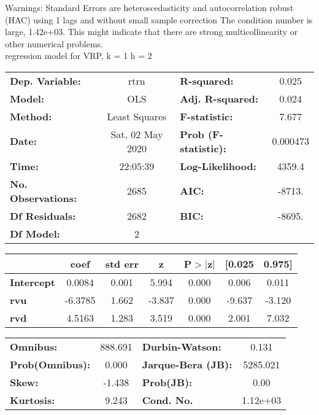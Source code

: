 Warnings: \newline
 [1] Standard Errors are heteroscedasticity and autocorrelation robust (HAC) using 1 lags and without small sample correction \newline
 [2] The condition number is large, 1.42e+03. This might indicate that there are \newline
 strong multicollinearity or other numerical problems.\\ 

regression model for VRP, k = 1 h = 2\begin{center}
\begin{tabular}{lclc}
\toprule
\textbf{Dep. Variable:}    &       rtrn       & \textbf{  R-squared:         } &     0.025   \\
\textbf{Model:}            &       OLS        & \textbf{  Adj. R-squared:    } &     0.024   \\
\textbf{Method:}           &  Least Squares   & \textbf{  F-statistic:       } &     7.677   \\
\textbf{Date:}             & Sat, 02 May 2020 & \textbf{  Prob (F-statistic):} &  0.000473   \\
\textbf{Time:}             &     22:05:39     & \textbf{  Log-Likelihood:    } &    4359.4   \\
\textbf{No. Observations:} &        2685      & \textbf{  AIC:               } &    -8713.   \\
\textbf{Df Residuals:}     &        2682      & \textbf{  BIC:               } &    -8695.   \\
\textbf{Df Model:}         &           2      & \textbf{                     } &             \\
\bottomrule
\end{tabular}
\begin{tabular}{lcccccc}
                   & \textbf{coef} & \textbf{std err} & \textbf{z} & \textbf{P$> |$z$|$} & \textbf{[0.025} & \textbf{0.975]}  \\
\midrule
\textbf{Intercept} &       0.0084  &        0.001     &     5.994  &         0.000        &        0.006    &        0.011     \\
\textbf{rvu}       &      -6.3785  &        1.662     &    -3.837  &         0.000        &       -9.637    &       -3.120     \\
\textbf{rvd}       &       4.5163  &        1.283     &     3.519  &         0.000        &        2.001    &        7.032     \\
\bottomrule
\end{tabular}
\begin{tabular}{lclc}
\textbf{Omnibus:}       & 888.691 & \textbf{  Durbin-Watson:     } &    0.131  \\
\textbf{Prob(Omnibus):} &   0.000 & \textbf{  Jarque-Bera (JB):  } & 5285.021  \\
\textbf{Skew:}          &  -1.438 & \textbf{  Prob(JB):          } &     0.00  \\
\textbf{Kurtosis:}      &   9.243 & \textbf{  Cond. No.          } & 1.12e+03  \\
\bottomrule
\end{tabular}
\end{center}

